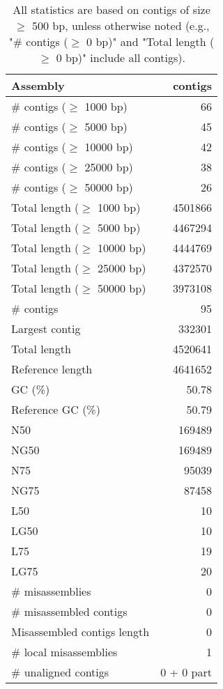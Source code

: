 \documentclass[12pt,a4paper]{article}
\begin{document}
\begin{table}[ht]
\begin{center}
\caption{All statistics are based on contigs of size $\geq$ 500 bp, unless otherwise noted (e.g., "\# contigs ($\geq$ 0 bp)" and "Total length ($\geq$ 0 bp)" include all contigs).}
\begin{tabular}{|l*{1}{|r}|}
\hline
Assembly & contigs \\ \hline
\# contigs ($\geq$ 1000 bp) & 66 \\ \hline
\# contigs ($\geq$ 5000 bp) & 45 \\ \hline
\# contigs ($\geq$ 10000 bp) & 42 \\ \hline
\# contigs ($\geq$ 25000 bp) & 38 \\ \hline
\# contigs ($\geq$ 50000 bp) & 26 \\ \hline
Total length ($\geq$ 1000 bp) & 4501866 \\ \hline
Total length ($\geq$ 5000 bp) & 4467294 \\ \hline
Total length ($\geq$ 10000 bp) & 4444769 \\ \hline
Total length ($\geq$ 25000 bp) & 4372570 \\ \hline
Total length ($\geq$ 50000 bp) & 3973108 \\ \hline
\# contigs & 95 \\ \hline
Largest contig & 332301 \\ \hline
Total length & 4520641 \\ \hline
Reference length & 4641652 \\ \hline
GC (\%) & 50.78 \\ \hline
Reference GC (\%) & 50.79 \\ \hline
N50 & 169489 \\ \hline
NG50 & 169489 \\ \hline
N75 & 95039 \\ \hline
NG75 & 87458 \\ \hline
L50 & 10 \\ \hline
LG50 & 10 \\ \hline
L75 & 19 \\ \hline
LG75 & 20 \\ \hline
\# misassemblies & 0 \\ \hline
\# misassembled contigs & 0 \\ \hline
Misassembled contigs length & 0 \\ \hline
\# local misassemblies & 1 \\ \hline
\# unaligned contigs & 0 + 0 part \\ \hline

\end{tabular}
\end{center}
\end{table}
\end{document}
